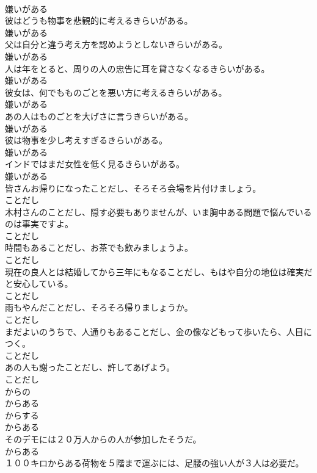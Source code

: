 \documentclass[8pt]{extreport}
\begin{document}
\begin{CJK}{UTF8}{min}
\\	嫌いがある
\\	彼はどうも物事を悲観的に考えるきらいがある。	
\\	嫌いがある
\\	父は自分と違う考え方を認めようとしないきらいがある。	
\\	嫌いがある
\\	人は年をとると、周りの人の忠告に耳を貸さなくなるきらいがある。	
\\	嫌いがある
\\	彼女は、何でもものごとを悪い方に考えるきらいがある。	
\\	嫌いがある
\\	あの人はものごとを大げさに言うきらいがある。	
\\	嫌いがある
\\	彼は物事を少し考えすぎるきらいがある。	
\\	嫌いがある
\\	インドではまだ女性を低く見るきらいがある。	
\\	嫌いがある
\\	皆さんお帰りになったことだし、そろそろ会場を片付けましょう。	
\\	ことだし
\\	木村さんのことだし、隠す必要もありませんが、いま胸中ある問題で悩んでいるのは事実ですよ。	
\\	ことだし
\\	時間もあることだし、お茶でも飲みましょうよ。	
\\	ことだし
\\	現在の良人とは結婚してから三年にもなることだし、もはや自分の地位は確実だと安心している。	
\\	ことだし
\\	雨もやんだことだし、そろそろ帰りましょうか。	
\\	ことだし
\\	まだよいのうちで、人通りもあることだし、金の像などもって歩いたら、人目につく。	
\\	ことだし
\\	あの人も謝ったことだし、許してあげよう。	
\\	ことだし
\\	からの 
\\	からある 
\\	からする 
\\	からある
\\	そのデモには２０万人からの人が参加したそうだ。	
\\	からある
\\	１００キロからある荷物を５階まで運ぶには、足腰の強い人が３人は必要だ。	

\end{CJK}
\end{document}

